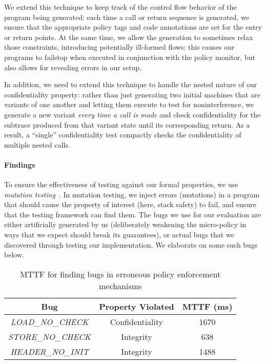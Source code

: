 \documentclass[acmsmall,review,anonymous]{acmart}\settopmatter{printfolios=true,printccs=false,printacmref=false}
\begin{document}
{We extend this technique to keep track of the control flow behavior of
the program being generated: each time a call or return sequence is
generated, we ensure that the appropriate policy tags and code
annotations are set for the entry or return points. At the same time,
we allow the generation to sometimes relax those constraints,
introducing potentially ill-formed flows: this causes our programs
to failstop when executed in conjunction with the policy monitor,
but also allows for revealing errors in our setup.

In addition, we need to extend this technique to handle the nested
nature of our confidentiality property: rather than just generating two
initial machines that are variants of one another and letting them
execute to test for noninterference, we generate a new variant
{\em every time a call is made} and check confidentiality for the
subtrace produced from that variant state until its corresponding
return. As a result, a ``single'' confidentiality test compactly
checks the confidentiality of multiple nested calls.

\paragraph*{Findings}

To ensure the effectiveness of testing against our formal properties, we
use {\em mutation testing}~\citep{JiaH11}. In mutation testing, we inject errors
(mutations) in a program that should cause the property of interest (here,
stack safety) to fail, and ensure that the testing framework can find
them. The bugs we use for our evaluation are either artificially generated
by us (deliberately weakening the micro-policy in ways that we expect
should break its guarantees), or actual bugs that we discovered through
testing our implementation. We elaborate on some such bugs below.

\begin{table}[]
\centering
\begin{tabular}{c|c|c}
  Bug & Property Violated & MTTF (ms) \\
  \hline
      {\em LOAD\_NO\_CHECK}  & Confidentiality & 1670 \\
      {\em STORE\_NO\_CHECK} & Integrity & 638 \\
      {\em HEADER\_NO\_INIT} & Integrity & 1488 \\
\end{tabular}
\vspace*{1em}
\caption{MTTF for finding bugs in erroneous policy enforcement mechanisms}
\vspace*{-2em}
\label{tab:bug-table}
\end{table}

}
\end{document}
